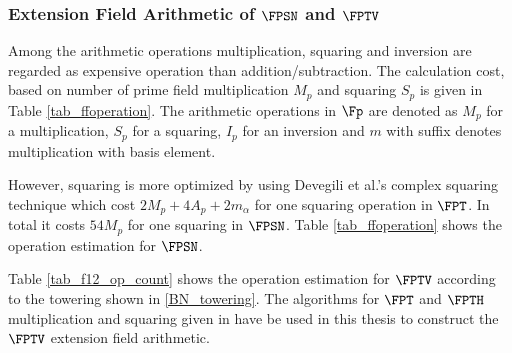 \subsubsection*{Extension Field Arithmetic  of $\FPSN$ and $\FPTV$}
Among the arithmetic operations multiplication, squaring and inversion are regarded as expensive operation than addition/subtraction. The calculation cost, based on number of prime field multiplication $M_p$ and squaring $S_p$ is given in Table \ref{tab_ffoperation}. The arithmetic operations in $\Fp$ are denoted as $M_p$ for a multiplication, $S_p$ for a squaring, $I_p$ for an inversion and $m$ with suffix denotes multiplication with basis element.
\begin{table*}[t]
\caption{Number of arithmetic operations in  $\FPSN$ based on \eqref{towering}}
\label{tab_ffoperation}
\centering
{}
\end{table*}
However, squaring is more optimized by using Devegili et al.'s \cite{EPRINT:DOSD06} complex squaring technique which cost $2M_p+4A_p+2m_\alpha$ for one squaring operation in $\FPT$. In total it costs $54M_p$ for one squaring in $\FPSN$. Table \ref{tab_ffoperation} shows the operation estimation for $\FPSN$.

Table \ref{tab_f12_op_count} shows the operation estimation for $\FPTV$ according to the towering shown in \eqref{BN_towering}. The algorithms for $\FPT$ and $\FPTH$ multiplication and squaring given in \cite{EPRINT:DEHR15} have be used in this thesis to construct the $\FPTV$ extension field arithmetic. 

\begin{table*}[t]
\caption{Number of arithmetic operations in $\FPTV$ based on \eqref{BN_towering}}
\label{tab_f12_op_count}
\centering
{}
\end{table*}

